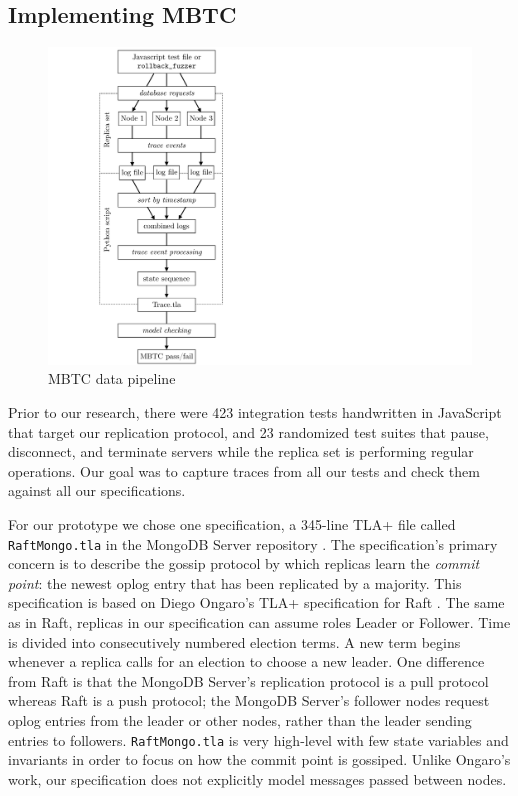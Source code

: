 \documentclass{vldb}
\begin{document}
\subsection{Implementing MBTC}
\label{subsec:mbtc_solution}

\begin{figure}
\includegraphics[width=\textwidth]{MBTC-pipeline.pdf}
\caption{MBTC data pipeline}
\label{figure:MBTC-pipline}
\end{figure}

Prior to our research, there were 423 integration tests handwritten in JavaScript that target our replication protocol, and 23 randomized test suites that pause, disconnect, and terminate servers while the replica set is performing regular operations. 
Our goal was to capture traces from all our tests and check them against all our specifications.

For our prototype we chose one specification, a 345-line TLA+ file called \texttt{RaftMongo.tla} in the MongoDB Server repository \cite{MongoGitHub}.
The specification's primary concern is to describe the gossip protocol by which replicas learn the \textit{commit point}: the newest oplog entry that has been replicated by a majority.
This specification is based on Diego Ongaro's TLA+ specification for Raft \cite{Ongaro14TLA+Raft}.
The same as in Raft, replicas in our specification can assume roles Leader or Follower. Time is divided into consecutively numbered election terms. A new term begins whenever a replica calls for an election to choose a new leader.
One difference from Raft is that the MongoDB Server's replication protocol is a pull protocol whereas Raft is a push protocol; the MongoDB Server's follower nodes request oplog entries from the leader or other nodes, rather than the leader sending entries to followers.
\texttt{RaftMongo.tla} is very high-level with few state variables and invariants in order to focus on how the commit point is gossiped. 
Unlike Ongaro's work, our specification does not explicitly model messages passed between nodes.
\end{document}
